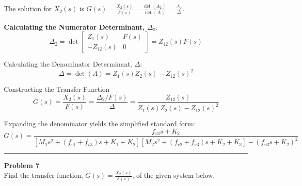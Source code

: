 \documentclass[11pt]{article}
\begin{document}
The solution for $X_2(s)$ is $G(s) = \frac{X_2(s)}{F(s)} = \frac{\det(A_2)}{\det(A)} = \frac{\Delta_2}{\Delta}$.

\vspace{12pt}
\noindent\textbf{Calculating the Numerator Determinant, $\Delta_2$}:
$$ \Delta_2 = \det
\begin{bmatrix}
Z_1(s) & F(s) \\
-Z_{12}(s) & 0
\end{bmatrix}
= Z_{12}(s)F(s) $$

{Calculating the Denominator Determinant, $\Delta$}:
$$\Delta = \det(A) = Z_1(s)Z_2(s) - Z_{12}(s)^2$$

{Constructing the Transfer Function}
$$G(s) = \frac{X_2(s)}{F(s)} = \frac{\Delta_2 / F(s)}{\Delta} = \frac{Z_{12}(s)}{Z_1(s)Z_2(s) - Z_{12}(s)^2}$$

Expanding the denominator yields the simplified standard form:
\[
\boxed{
G(s) = \frac{f_{v3}s + K_2}{[M_1s^2 + (f_{v1} + f_{v3})s + K_1 + K_2][M_2s^2 + (f_{v2} + f_{v3})s + K_2 + K_3] - (f_{v3}s + K_2)^2}
}
\]



\newpage
  \setcounter{page}{12}  
\noindent\rule{\textwidth}{1pt}
\noindent\textbf{Problem 7} \hfill 
\\ Find the transfer function, $G(s)=\frac{X_2(s)}{F(s)}$, of the given system below.
\end{document}
